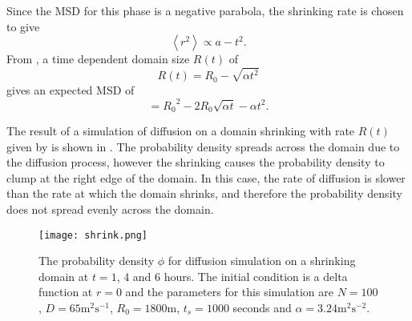 Since the MSD for this phase is a negative parabola, the shrinking rate is chosen to give
%
 \begin{equation}
 \left<r^2\right> \propto a - t^2.
 \label{eqn:MSD_shrink}
 \end{equation}
%
From , a time dependent domain size $R(t)$ of
%
\begin{equation}
R(t) = R_0 - \sqrt{\alpha t^2}
\label{eqn:Rt}
\end{equation}
%
gives an expected MSD of
 \begin{equation}
 = {R_0}^2 - 2R_0\sqrt{\alpha t} -\alpha t^2.
 \end{equation}

The result of a simulation of diffusion on a domain shrinking with rate $R(t)$ given by  is shown in . The probability density spreads across the domain due to the diffusion process, however the shrinking causes the probability density to clump at the right edge of the domain. In this case, the rate of diffusion is slower than the rate at which the domain shrinks, and therefore the probability density does not spread evenly across the domain.
%
    \begin{figure} [h]
        \centering
            \texttt{[image: shrink.png]}
            \caption{The probability density $\phi$ for diffusion simulation on a shrinking domain at $t = 1$, 4 and 6 hours. The initial condition is a delta function at $r = 0$ and the
             parameters for this simulation are $N = 100$, $D = 65\mathrm{m^2s^{-1}}$, $R_0 = 1800$m, $t_s = 1000$ seconds and $\alpha  = 3.24 \mathrm{m^2s^{-2}}$.}
        \label{fig:shrink_phi}
    \end{figure}
